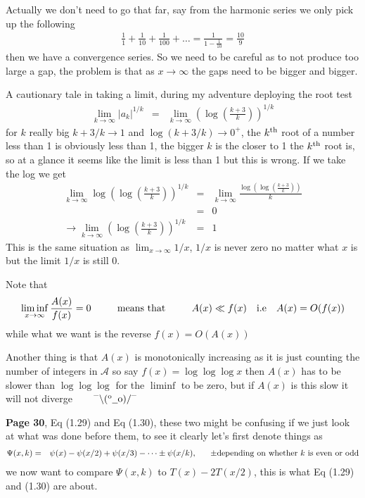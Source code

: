 \documentclass[aps,preprint,preprintnumbers,nofootinbib,showpacs,prd]{revtex4-1}
\newcommand{\nbea}{\begin{eqnarray*}}
\newcommand{\neea}{\end{eqnarray*}}
\newcommand{\dunno}{$ {}^{\mbox {--}}\backslash(^{\rm o}{}\underline{\hspace{0.2cm}}{\rm o})/^{\mbox {--}}$}
\begin{document}
Actually we don't need to go that far, say from the harmonic series we only pick up the following
%
\nbea
\frac{1}{1} + \frac{1}{10} + \frac{1}{100} + \dots = \frac{1}{1 - \frac{1}{10}} = \frac{10}{9}
\neea
%
then we have a convergence series. So we need to be careful as to not produce too large a gap, the problem is that as $x\to\infty$ the gaps need to be bigger and bigger.

A cautionary tale in taking a limit, during my adventure deploying the root test
%
\nbea
\lim_{k\to\infty} \left|a_k\right|^{1/k} & = & \lim_{k\to\infty} \left(\log\left(\frac{k+3}{k}\right)\right)^{1/k}
\neea 
%
for $k$ really big $k+3/k \to 1$ and $\log(k+3/k) \to 0^{+}$, the $k^{\rm th}$ root of a number less than 1 is obviously less than 1, the bigger $k$ is the closer to 1 the $k^{\rm th}$ root is, so at a glance it seems like the limit is less than 1 but this is wrong. If we take the log we get
%
\nbea
\lim_{k\to\infty} \log\left(\log\left(\frac{k+3}{k}\right)\right)^{1/k} & = & \lim_{k\to\infty} \frac{\log\left(\log\left(\frac{k+3}{k}\right)\right)}{k} \\
& = & 0 \\
\to \lim_{k\to\infty} \left(\log\left(\frac{k+3}{k}\right)\right)^{1/k} & = & 1
\neea
%
This is the same situation as $\lim_{x\to\infty} 1/x$, $1/x$ is never zero no matter what $x$ is but the limit $1/x$ is still 0.


Note that
%
\nbea
\liminf_{x\to\infty} \frac{A(x)}{f(x)} = 0 ~~~~~~~~ {\rm means~that} ~~~~~~~~ A(x) \ll f(x) ~~~{\rm i.e} ~~~ A(x) = O(f(x))
\neea
%
while what we want is the reverse $f(x) = O(A(x))$

Another thing is that $A(x)$ is monotonically increasing as it is just counting the number of integers in $\mathcal{A}$ so say $f(x) = \log\log\log x$ then $A(x)$ has to be slower than $\log\log\log$ for the $\liminf$ to be zero, but if $A(x)$ is this slow it will not diverge ~~~ \dunno

{\bf Page 30}, Eq (1.29) and Eq (1.30), these two might be confusing if we just look at what was done before them, to see it clearly let's first denote things as
%
\nbea
\Psi(x,k) & = & \psi(x) - \psi(x/2) + \psi(x/3) - \dots \pm \psi(x/k), ~~~~~ \pm {\rm depending~on~whether~} k ~{\rm is~even~or~odd}
\neea
%
we now want to compare $\Psi(x,k)$ to $T(x) - 2T(x/2)$, this is what Eq (1.29) and (1.30) are about.
\end{document}
